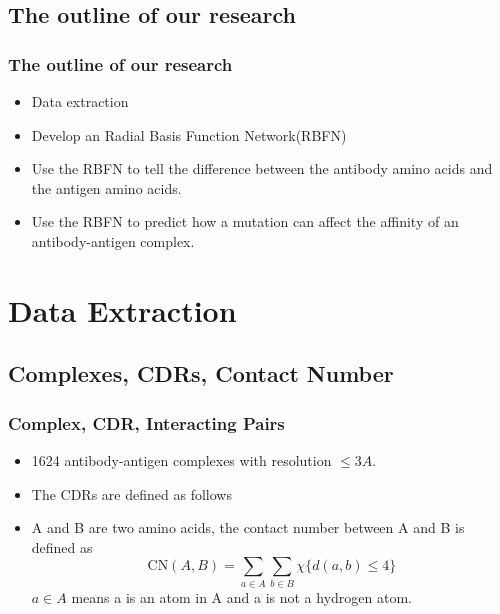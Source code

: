 \documentclass[hyperref={pdfpagelabels=false}]{beamer}
\begin{document}
\subsection{The outline of our research}
\begin{frame}
\frametitle{The outline of our research}
	\begin{itemize}
		\item Data extraction
		\item Develop an Radial Basis Function Network(RBFN)
		\item Use the RBFN to tell the difference between the antibody amino acids and the antigen amino acids.
		\item Use the RBFN to predict how a mutation can affect the affinity of an antibody-antigen complex.
	\end{itemize}
\end{frame}

\section{Data Extraction} 
\subsection{Complexes, CDRs, Contact Number}
\begin{frame}
	\frametitle{Complex, CDR, Interacting Pairs}
	\begin{itemize}
		\item 1624 antibody-antigen complexes with resolution $\leq3A$.
		
		\item The CDRs are defined as follows
		\begin{table}[H]

\caption{Locations of the CDRs}\label{CDRs_Range}
\end{table}
\item A and B are two amino acids, the contact number between A and B is defined as 
$$\text{CN}(A,B)=\sum\limits_{a\in A}\sum\limits_{b\in B} \chi\{d(a,b) \leq 4\}$$
\small{$a\in A $ means a is an atom in A and a is not a hydrogen atom. }
	\end{itemize}
\end{frame}
\end{document}
